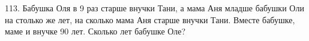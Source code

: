 113. Бабушка Оля в 9 раз старше внучки Тани, а мама Аня младше бабушки Оли на столько же лет, на сколько мама Аня старше внучки Тани. Вместе бабушке, маме и внучке 90 лет. Сколько лет бабушке Оле?\\
